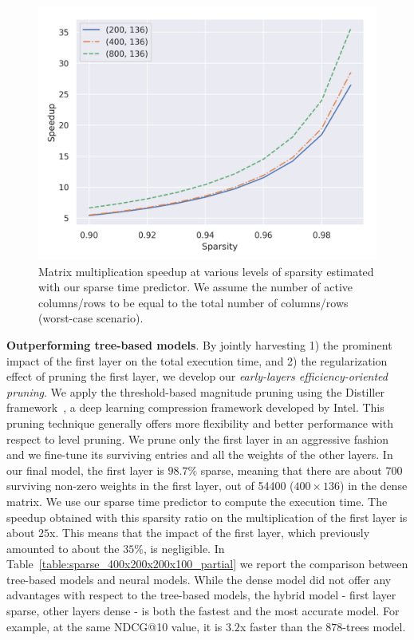 \begin{figure}[t]
\centering
\includegraphics[width=\columnwidth]{imgs/sparse_speedup.png}
\caption{Matrix multiplication speedup at various levels of sparsity estimated with our sparse time predictor. We assume the number of active columns/rows to be equal to the total number of columns/rows (worst-case scenario).\label{fig:sparsespeedup}}
\end{figure}

\smallskip
\noindent \textbf{Outperforming tree-based models}.
By jointly harvesting 1) the prominent impact of the first layer on the total execution time, and 2) the regularization effect of pruning the first layer, we develop our \textit{ early-layers efficiency-oriented pruning}. We apply the threshold-based magnitude pruning using the Distiller framework~\cite{nzmora2019distiller}, a deep learning compression framework developed by Intel. This pruning technique generally offers more flexibility and better performance with respect to level pruning. We prune only the first layer in an aggressive fashion and we fine-tune its surviving entries and all the weights of the other layers.
In our final model, the first layer is $98.7\%$ sparse, meaning that there are about $700$ surviving non-zero weights in the first layer, out of 54400 ($400 \times 136$) in the dense matrix.
We use our sparse time predictor to compute the execution time. The speedup obtained with this sparsity ratio on the multiplication of the first layer is about $25$x. This means that the impact of the first layer, which previously amounted to about the $35\%$, is negligible.
In Table~\ref{table:sparse_400x200x200x100_partial} we report the comparison between tree-based models and neural models. While the dense model did not offer any advantages with respect to the tree-based models, the hybrid model - first layer sparse, other layers dense - is both the fastest and the most accurate model. For example, at the same NDCG@10 value, it is $3.2$x faster than the $878$-trees model. 


